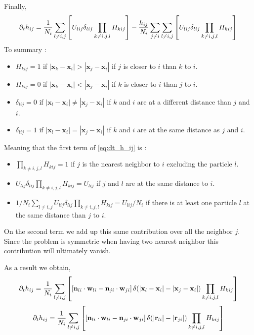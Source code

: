 Finally, 
\begin{multline}
    \partial_t h_{ij}
    = 
   \frac{1}{N_i} \sum_{l \neq i,j} \left[
    U_{lij}
    \delta_{lij}
    \prod_{k \neq i,j,l}
    H_{kij} 
    \right] 
    -  \frac{h_{ij}}{N_i}
    \sum_{j\neq i}
    \sum_{l \neq i,j} \left[
        U_{lij}
        \delta_{lij}
        \prod_{k \neq i,j,l}
        H_{kij} 
    \right]
    \label{eq:dt_h_ij}
\end{multline}
To summary : 
\begin{itemize}
    \item $H_{kij} =  1$ if $|\textbf{x}_k - \textbf{x}_i| > |\textbf{x}_j - \textbf{x}_i|$ if $j$ is closer to $i$ than $k$ to $i$.
    \item $H_{kij} =  0$ if $|\textbf{x}_k - \textbf{x}_i| < |\textbf{x}_j - \textbf{x}_i|$ if $k$ is closer to $i$ than $j$ to $i$.
    \item $\delta_{lij} =  0$ if $|\textbf{x}_l - \textbf{x}_i| \neq |\textbf{x}_j - \textbf{x}_i|$ if $k$ and $i$ are at a different distance than $j$ and $i$. 
    \item $\delta_{lij} =  1$ if $|\textbf{x}_l - \textbf{x}_i| = |\textbf{x}_j - \textbf{x}_i|$ if $k$ and $i$ are at the same distance as $j$ and $i$. 
\end{itemize}
Meaning that the first term of \ref{eq:dt_h_ij} is :
\begin{itemize}
    \item $\prod_{k \neq i,j,l} H_{kij} = 1$ if $j$ is the nearest neighbor to $i$ excluding the particle $l$. 
    \item $U_{lij}\delta_{lij}\prod_{k \neq i,j,l} H_{kij} = U_{lij}$ if $j$ and $l$ are at the same distance to $i$. 
    \item $1/N_i\sum_{l\neq i,j}U_{lij}\delta_{lij}\prod_{k \neq i,j,l} H_{kij} = U_{lij}/N_i$ if there is at least one particle $l$ at the same distance than $j$ to $i$.  
\end{itemize}

On the second term we add up this same contribution over all the neighbor $j$. 
Since the problem is symmetric when having two nearest neighbor this contribution will ultimately vanish. 


As a result we obtain, 
\begin{equation*}
    \partial_t h_{ij} 
    = \frac{1}{N_i} \sum_{l \neq i,j} \left[
        \left[
    \textbf{n}_{li}\cdot \textbf{w}_{li}
    - 
    \textbf{n}_{ji}\cdot\textbf{w}_{ji}
    \right]\delta(|\textbf{x}_l - \textbf{x}_i| - |\textbf{x}_j - \textbf{x}_i|)
        \prod_{k \neq i,j,l}
        H_{kij} 
        \right] 
\end{equation*}
\begin{equation*}
    \partial_t h_{ij} 
    = \frac{1}{N_i} \sum_{l \neq i,j} \left[
        \left[
    \textbf{n}_{li}\cdot \textbf{w}_{li}
    - 
    \textbf{n}_{ji}\cdot\textbf{w}_{ji}
    \right]\delta(|\textbf{r}_{li}| - |\textbf{r}_{ji}|)
        \prod_{k \neq i,j,l}
        H_{kij} 
        \right] 
\end{equation*}


